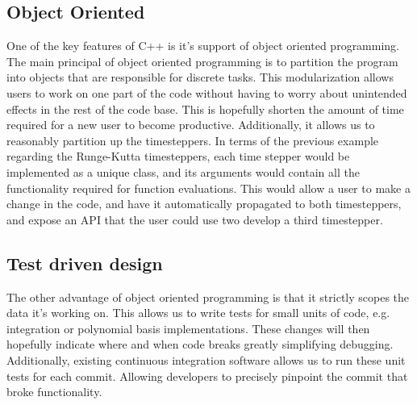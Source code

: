 \subsection{Object Oriented}
One of the key features of C++ is it's support of object oriented programming. The main principal of object oriented programming is to partition the program into objects that are responsible for discrete tasks. This modularization allows users to work on one part of the code without having to worry about unintended effects in the rest of the code base. This is hopefully shorten the amount of time required for a new user to become productive. Additionally, it allows us to reasonably partition up the timesteppers. In terms of the previous example regarding the Runge-Kutta timesteppers, each time stepper would be implemented as a unique class, and its arguments would contain all the functionality required for function evaluations.  This would allow a user to make a change in the code, and have it automatically propagated to both timesteppers, and expose an API that the user could use two develop a third timestepper.

\subsection{Test driven design}
The other advantage of object oriented programming is that it strictly scopes the data it's working on. This allows us to write tests for small units of code, e.g. integration or polynomial basis implementations. These changes will then hopefully indicate where and when code breaks greatly simplifying debugging. Additionally, existing continuous integration software allows us to run these unit tests for each commit. Allowing developers to precisely pinpoint the commit that broke functionality.

